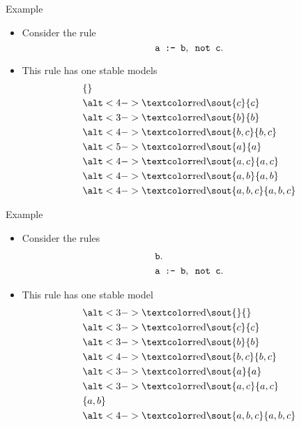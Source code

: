 \begin{frame}[c]{Example}
  \begin{itemize}
  \item Consider the rule
    \[
      {\tt a\texttt{ :- } b,\texttt{ not }c.}
    \]
  \item <3-> This rule has one stable models
    \begin{align*}
      &\{\}\\
      &\STROUT{4-}{c}\\
      &\STROUT{3-}{b}\\
      &\STROUT{4-}{b,c}\\
      &\STROUT{5-}{a}\\
      &\STROUT{4-}{a,c}\\
      &\STROUT{4-}{a,b}\\
      &\STROUT{4-}{a,b,c}
    \end{align*}
  \end{itemize}
\end{frame}
\begin{frame}[c]{Example}
  \begin{itemize}
  \item Consider the rules
    \begin{align*}
      &{\tt b.}\\
      &{\tt a\texttt{ :- } b,\texttt{ not }c.}
    \end{align*}
  \item <2-> This rule has one stable model
    \begin{align*}
      &\STROUT{3-}{}\\
      &\STROUT{3-}{c}\\
      &\STROUT{3-}{b}\\
      &\STROUT{4-}{b,c}\\
      &\STROUT{3-}{a}\\
      &\STROUT{3-}{a,c}\\
      &\{a,b\}\\
      &\STROUT{4-}{a,b,c}
    \end{align*}
  \end{itemize}
\end{frame}
